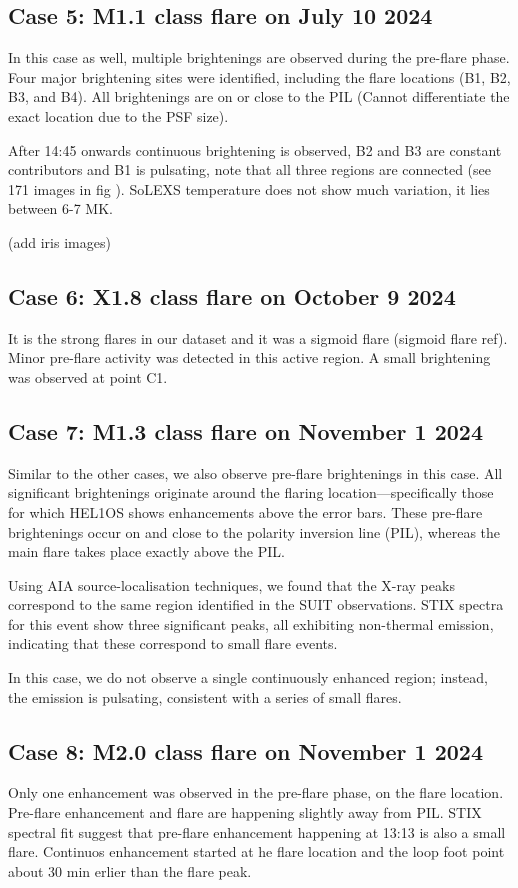 \documentclass[fleqn,usenatbib]{mnras}
\begin{document}
\subsection{Case 5: M1.1 class flare on July 10 2024} 
In this case as well, multiple brightenings are observed during the pre-flare phase. Four major brightening sites were identified, including the flare locations (B1, B2, B3, and B4). 
All brightenings are on or close to the PIL (Cannot differentiate the exact location due to the PSF size).

After 14:45 onwards continuous brightening is observed, B2 and B3 are constant contributors and B1 is pulsating, note that all three regions are connected (see 171 images in fig ).
SoLEXS temperature does not show much variation, it lies between 6-7 MK.

(add iris images)

\subsection{Case 6: X1.8 class flare on October 9 2024}
It is the strong flares in our dataset and it was a sigmoid flare (sigmoid flare ref).
Minor pre-flare activity was detected in this active region. A small brightening was observed at point C1.

\subsection{Case 7: M1.3 class flare on November 1 2024}
Similar to the other cases, we also observe pre-flare brightenings in this case. 
All significant brightenings originate around the flaring location—specifically those for which HEL1OS shows enhancements above the error bars. These pre-flare brightenings occur on and close to the polarity inversion line (PIL), whereas the main flare takes place exactly above the PIL.

Using AIA source-localisation techniques, we found that the X-ray peaks correspond to the same region identified in the SUIT observations. 
STIX spectra for this event show three significant peaks, all exhibiting non-thermal emission, indicating that these correspond to small flare events.

In this case, we do not observe a single continuously enhanced region; instead, the emission is pulsating, consistent with a series of small flares.

\subsection{Case 8: M2.0 class flare on November 1 2024}
Only one enhancement was observed in the pre-flare phase, on the flare location.
Pre-flare enhancement and flare are happening slightly away from PIL.
STIX spectral fit suggest that pre-flare enhancement happening at 13:13 is also a small flare.
Continuos enhancement started at he flare location and the loop foot point about 30 min erlier than the flare peak.
\end{document}
